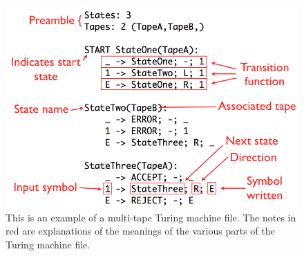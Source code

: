 \begin{figure} 
\begin{center} 
\includegraphics[scale=0.4]{figs/annotatedtm.png} 
\caption{This is an example of a multi-tape Turing machine file. The notes in red are explanations of the meanings of the various parts of the Turing machine file. \label{fig:tmexample}} 
\end{center} 
\end{figure}

